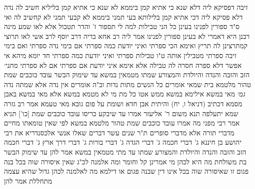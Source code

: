 \documentclass[12pt, openany]{book}
\begin{document}
{זיבה דפסיקא ליה דלא שנא כי אתיא קמן ביממא לא שנא כי אתיא קמן בליליא חשיב לה נדה דלא פסיקא ליה דכי אתיא קמן בלילותא בעי תמני ביממא לא קבעי תמני לא קחשיב לה 
ואי ס"ד ספורין לפנינו בעינן כל הני טבילות למה לי תספור ז' והדר תטבול אלא לאו שמע מינה רבנן היא דאמרי לא בעינן ספורין לפנינו 
אמר ליה רב אחא בריה דרב יוסף לרב אשי לאו תרוצי קמתרצינן לה תריץ ואימא הכי ספרתי ואיני יודעת כמה ספרתי אם בימי נדה ספרתי ואם בימי זיבה ספרתי מטבילין אותה ט"ו טבילות 
ספרתי ואיני יודעת כמה ספרתי חד יומא מיהא אי אפשר דלא ספרה חסרה לה טבילה 
אלא אימא איני יודעת אם ספרתי אם לא ספרתי
{\large\emph{מתני׳}} הזב והזבה והנדה והיולדת והמצורע שמתו מטמאין במשא עד שימוק הבשר עובד כוכבים שמת טהור מלטמא 
בית שמאי אומרים כל הנשים מתות נדות וב"ה אומרים אין נדה אלא שמתה נדה
{\large\emph{גמ׳}} מאי במשא אילימא במשא ממש אטו כל מת מי לא מטמא במשא 
אלא מאי במשא באבן מסמא
דכתיב (דניאל ו, יח) והיתית אבן חדא ושומת על פום גובא 
מאי טעמא אמר רב גזרה שמא יתעלפה 
תנא משום ר' אליעזר אמרו עד שיבקע כריסו
עובד כוכבים שמת [כו'] תניא אמר רבי מפני מה אמרו עובד כוכבים שמת טהור מלטמא במשא לפי שאין טומאתו מחיים מדברי תורה אלא מדברי סופרים 
ת"ר שנים עשר דברים שאלו אנשי אלכסנדריא את רבי יהושע בן חיננא ג' דברי חכמה ג' דברי הגדה ג' דברי בורות ג' דברי דרך ארץ 
ג' דברי חכמה הזב והזבה והנדה והיולדת והמצורע שמתו עד מתי מטמאין במשא אמר להן עד שימוק הבשר 
בת משולחת מה היא לכהן 
מי אמרינן קל וחומר ומה אלמנה לכ"ג שאין איסורה שוה בכל בנה פגום זו שאיסורה שוה בכל אינו דין שבנה פגום או דילמא מה לאלמנה לכהן גדול שהיא עצמה מתחללת 
אמר להן}
\end{document}
